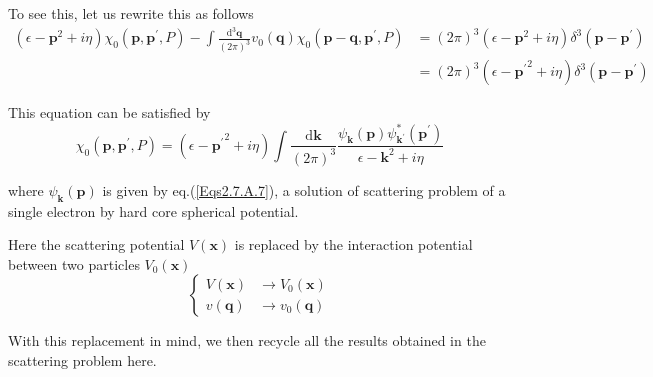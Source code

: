 To see this, let us rewrite this as follows
\begin{equation*} \label{Eqs2.7.18''} \tag{2.7.18''}
\begin{split}
(\epsilon-\mathbf{p}^2+i\eta)\chi_0(\mathbf{p},\mathbf{p}^{'},P) - \int\frac{\mathrm{d}^3\mathbf{q}}{(2\pi)^3}v_0(\mathbf{q}) \chi_0(\mathbf{p}-\mathbf{q},\mathbf{p}^{'},P)
&=(2\pi)^3 (\epsilon-\mathbf{p}^2+i\eta) \delta^3(\mathbf{p}-\mathbf{p}^{'})\\
&=(2\pi)^3 (\epsilon-{\mathbf{p}^{'}}^2+i\eta) \delta^3(\mathbf{p}-\mathbf{p}^{'})\end{split}
\end{equation*}

This equation can be satisfied by
\begin{equation} \label{Eqs2.7.20}
\chi_0(\mathbf{p},\mathbf{p}^{'},P) = (\epsilon - {\mathbf{p}^{'}}^2 + i \eta) \int \frac{\mathrm{d}\mathbf{k}}{(2\pi)^3} \frac{\psi_{\mathbf{k}}(\mathbf{p})\psi_{\mathbf{k}^{'}}^{*} (\mathbf{p}^{'})}{\epsilon - \mathbf{k}^2 + i \eta}
\end{equation}

where $\psi_{\mathbf{k}}(\mathbf{p})$ is given by eq.(\ref{Eqs2.7.A.7}), a solution of scattering problem of a single electron by hard core spherical potential.

Here the scattering potential $V(\mathbf{x})$ is replaced by the interaction potential between two particles $V_0(\mathbf{x})$
\begin{equation} \label{Eqs2.7.21}
\left\{ \begin{aligned} V(\mathbf{x}) &\rightarrow V_0(\mathbf{x})\\ v(\mathbf{q}) &\rightarrow v_0(\mathbf{q})
\end{aligned} \right.
\end{equation}

With this replacement in mind, we then recycle all the results obtained in the scattering problem here.

